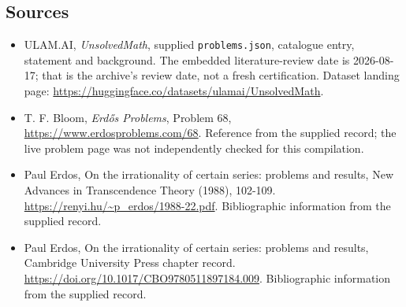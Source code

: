 \documentclass[11pt,a4paper]{article}
\begin{document}
\subsection{Sources}

{\small

\begin{itemize}

\item[\hypertarget{source:statement:1}{S1}] ULAM.AI, \emph{UnsolvedMath}, supplied \texttt{problems.json}, catalogue entry, statement and background. The embedded literature-review date is 2026-08-17; that is the archive’s review date, not a fresh certification. Dataset landing page: \url{https://huggingface.co/datasets/ulamai/UnsolvedMath}.

\item[\hypertarget{source:statement:2}{S2}] T. F. Bloom, \emph{Erdős Problems}, Problem 68, \url{https://www.erdosproblems.com/68}. Reference from the supplied record; the live problem page was not independently checked for this compilation.

\item[\hypertarget{source:statement:3}{S3}] Paul Erdos, On the irrationality of certain series: problems and results, New Advances in Transcendence Theory (1988), 102-109. \url{https://renyi.hu/~p_erdos/1988-22.pdf}. Bibliographic information from the supplied record.

\item[\hypertarget{source:statement:4}{S4}] Paul Erdos, On the irrationality of certain series: problems and results, Cambridge University Press chapter record. \url{https://doi.org/10.1017/CBO9780511897184.009}. Bibliographic information from the supplied record.

\end{itemize}

}

\label{end:statement}
\end{document}

